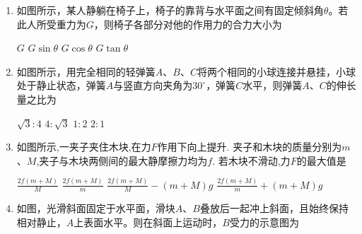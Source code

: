 
\begin{enumerate}[leftmargin=0em]
\renewcommand{\labelenumi}{\arabic{enumi}.}
\item
{}
如图所示，某人静躺在椅子上，椅子的靠背与水平面之间有固定倾斜角$ \theta $。若此人所受重力为$ G $，则椅子各部分对他的作用力的合力大小为 
\begin{figure}[h!]
\centering

\end{figure}

\fourchoices
{$ G $ }
{$ G \sin \theta $}
{$ G \cos \theta $ }
{$ G \tan \theta $}


\item
{}
如图所示，用完全相同的轻弹簧$ A $、$ B $、$ C $将两个相同的小球连接并悬挂，小球处于静止状态，弹簧$ A $与竖直方向夹角为$ 30 ^{ \circ } $，弹簧$ C $水平，则弹簧$ A $、$ C $的伸长量之比为 
\begin{figure}[h!]
\centering

\end{figure}

\fourchoices
{$ \sqrt { 3 }: 4 $}
{$ 4: \sqrt { 3 } $}
{$ 1: 2 $}
{$ 2: 1 $}



\item
{}
如图所示,一夹子夹住木块,在力$ F $作用下向上提升. 夹子和木块的质量分别为$ m $、$ M $,夹子与木块两侧间的最大静摩擦力均为$ f $. 若木块不滑动,力$ F $的最大值是 
\begin{figure}[h!]
\centering

\end{figure}




\fourchoices
{$\frac { 2 f ( m + M ) } { M }$}
{$\frac { 2 f ( m + M ) } { m }$}
{$\frac { 2 f ( m + M ) } { M } - ( m + M ) g$}
{$\frac { 2 f ( m + M ) } { m } + ( m + M ) g$}


\newpage
\item 
{}
如图，光滑斜面固定于水平面，滑块$ A $、$ B $叠放后一起冲上斜面，且始终保持相对静止，$ A $上表面水平。则在斜面上运动时，$ B $受力的示意图为 
\begin{figure}[h!]
\centering

\end{figure}


\end{enumerate}

